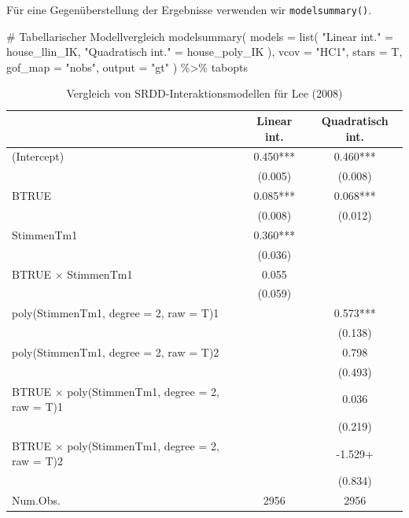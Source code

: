 \documentclass[
  a4paper,
  DIV=11,
  oneside]{scrreprt}
\newenvironment{Shaded}{\begin{snugshade}}{\end{snugshade}}
\newcommand{\AttributeTok}[1]{\textcolor[rgb]{0.40,0.45,0.13}{#1}}
\newcommand{\CommentTok}[1]{\textcolor[rgb]{0.37,0.37,0.37}{#1}}
\newcommand{\FunctionTok}[1]{\textcolor[rgb]{0.28,0.35,0.67}{#1}}
\newcommand{\NormalTok}[1]{\textcolor[rgb]{0.00,0.23,0.31}{#1}}
\newcommand{\OtherTok}[1]{\textcolor[rgb]{0.00,0.23,0.31}{#1}}
\newcommand{\SpecialCharTok}[1]{\textcolor[rgb]{0.37,0.37,0.37}{#1}}
\newcommand{\StringTok}[1]{\textcolor[rgb]{0.13,0.47,0.30}{#1}}
\begin{document}
Für eine Gegenüberstellung der Ergebnisse verwenden wir
\texttt{modelsummary()}.

\begin{Shaded}
\begin{Highlighting}[]
\CommentTok{\# Tabellarischer Modellvergleich}
\FunctionTok{modelsummary}\NormalTok{(}
  \AttributeTok{models =} \FunctionTok{list}\NormalTok{(}
    \StringTok{"Linear int."} \OtherTok{=}\NormalTok{ house\_llin\_IK, }
    \StringTok{"Quadratisch int."} \OtherTok{=}\NormalTok{ house\_poly\_IK}
\NormalTok{  ),  }
  \AttributeTok{vcov =} \StringTok{"HC1"}\NormalTok{, }
  \AttributeTok{stars =}\NormalTok{ T,}
  \AttributeTok{gof\_map =} \StringTok{"nobs"}\NormalTok{, }
  \AttributeTok{output =} \StringTok{"gt"}
\NormalTok{) }\SpecialCharTok{\%\textgreater{}\%} 
\NormalTok{  tabopts}
\end{Highlighting}
\end{Shaded}

\setlength{\LTpost}{0mm}

\begin{longtable}{lcc}

\caption{\label{tbl-intmodsLee}Vergleich von SRDD-Interaktionsmodellen
für Lee (2008)}

\tabularnewline

\toprule
  & Linear int. & Quadratisch int. \\ 
\midrule\addlinespace[2.5pt]
(Intercept) & 0.450*** & 0.460*** \\ 
 & (0.005) & (0.008) \\ 
BTRUE & 0.085*** & 0.068*** \\ 
 & (0.008) & (0.012) \\ 
StimmenTm1 & 0.360*** &  \\ 
 & (0.036) &  \\ 
BTRUE × StimmenTm1 & 0.055 &  \\ 
 & (0.059) &  \\ 
poly(StimmenTm1, degree = 2, raw = T)1 &  & 0.573*** \\ 
 &  & (0.138) \\ 
poly(StimmenTm1, degree = 2, raw = T)2 &  & 0.798 \\ 
 &  & (0.493) \\ 
BTRUE × poly(StimmenTm1, degree = 2, raw = T)1 &  & 0.036 \\ 
 &  & (0.219) \\ 
BTRUE × poly(StimmenTm1, degree = 2, raw = T)2 &  & -1.529+ \\ 
 &  & (0.834) \\ 
Num.Obs. & 2956 & 2956 \\ 
\bottomrule

\end{longtable}
\end{document}
